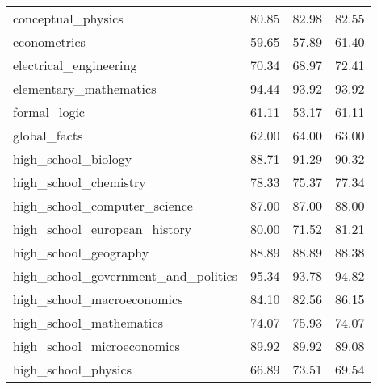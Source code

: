 \begin{table}[t]
\begin{tabular}{L{0.35}C{0.15}C{0.15}C{0.15}}
        conceptual\_physics                     & 80.85                    & 82.98                & 82.55                      \\
        econometrics                            & 59.65                    & 57.89                & 61.40                      \\
        electrical\_engineering                 & 70.34                    & 68.97                & 72.41                      \\
        elementary\_mathematics                 & 94.44                    & 93.92                & 93.92                      \\
        formal\_logic                           & 61.11                    & 53.17                & 61.11                      \\
        global\_facts                           & 62.00                    & 64.00                & 63.00                      \\
        high\_school\_biology                   & 88.71                    & 91.29                & 90.32                      \\
        high\_school\_chemistry                 & 78.33                    & 75.37                & 77.34                      \\
        high\_school\_computer\_science         & 87.00                    & 87.00                & 88.00                      \\
        high\_school\_european\_history         & 80.00                    & 71.52                & 81.21                      \\
        high\_school\_geography                 & 88.89                    & 88.89                & 88.38                      \\
        high\_school\_government\_and\_politics & 95.34                    & 93.78                & 94.82                      \\
        high\_school\_macroeconomics            & 84.10                    & 82.56                & 86.15                      \\
        high\_school\_mathematics               & 74.07                    & 75.93                & 74.07                      \\
        high\_school\_microeconomics            & 89.92                    & 89.92                & 89.08                      \\
        high\_school\_physics                   & 66.89                    & 73.51                & 69.54                      \\

\end{tabular}
\end{table}

